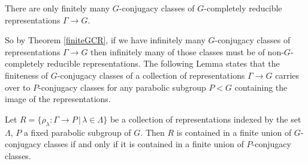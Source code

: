 \begin{theorem} \label{finiteGCR} There are only finitely many $G$-conjugacy classes of $G$-completely reducible representations $\Gamma\rightarrow G$.
\end{theorem}

So by Theorem \ref{finiteGCR}, if we have infinitely many $G$-conjugacy classes of representations $\Gamma\rightarrow G$ then infinitely many of those classes must be of non-$G$-completely reducible representations. The following Lemma states that the finiteness of $G$-conjugacy classes of a collection of representations $\Gamma\rightarrow G$ carries over to $P$-conjugacy classes for any parabolic subgroup $P<G$ containing the image of the representations.

\begin{lemma}\label{GIsPConj} Let $R=\{\rho_\lambda:\Gamma\rightarrow P\, |\, \lambda \in \Lambda\}$ be a collection of representations indexed by the set $\Lambda$, $P$ a fixed parabolic subgroup of $G$. Then $R$ is contained in a finite union of $G$-conjugacy classes if and only if it is contained in a finite union of $P$-conjugacy classes.
\end{lemma}
